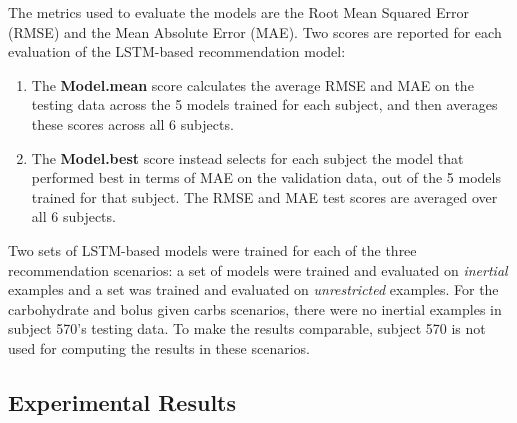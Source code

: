 \documentclass[graybox]{svmult}
\begin{document}
The metrics used to evaluate the models are the Root Mean Squared Error (RMSE) and the Mean Absolute Error (MAE). Two scores are reported for each evaluation of the LSTM-based recommendation model:
\begin{enumerate}
    \item The {\bf Model.mean} score calculates the average RMSE and MAE on the testing data across the 5 models trained for each subject, and then averages these scores across all 6 subjects.
    \item The {\bf Model.best} score instead selects for each subject the model that performed best in terms of MAE on the validation data, out of the 5 models trained for that subject. The RMSE and MAE test scores are averaged over all 6 subjects.
\end{enumerate}
Two sets of LSTM-based models were trained for each of the three recommendation scenarios: a set of models were trained and evaluated on {\it inertial} examples and a set was trained and evaluated on {\it unrestricted} examples. For the carbohydrate and bolus given carbs scenarios, there were no inertial examples in subject 570's testing data. To make the results comparable, subject 570 is not used for computing the results in these scenarios.

\subsection{Experimental Results}
\label{sec:results}
\end{document}
